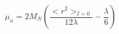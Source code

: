 \begin{equation}
\mu_n = 2 M_N (\frac{<r^2>_{I=0} }{12 \lambda} - \frac{\lambda}{6})
\end{equation}

